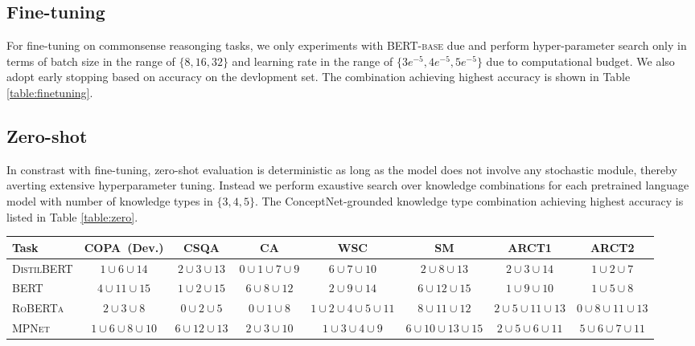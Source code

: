 \documentclass[11pt,a4paper]{article}
\newcommand{\tabref}[1]{Table \ref{#1}}
\begin{document}
\subsection{Fine-tuning}
For fine-tuning on commonsense reasonging tasks, we only experiments with \textsc{BERT-base} due and perform hyper-parameter search only in terms of batch size in the range of $\{8, 16, 32\}$ and learning rate in the range of $\{3e^{-5}, 4e^{-5}, 5e^{-5}\}$ due to computational budget. We also adopt early stopping based on accuracy on the devlopment set. The combination achieving highest accuracy is shown in \tabref{table:finetuning}.

\subsection{Zero-shot}
In constrast with fine-tuning, zero-shot evaluation is deterministic as long as the model does not involve any stochastic module, thereby averting extensive hyperparameter tuning.
Instead we perform exaustive search over knowledge combinations for each pretrained language model with number of knowledge types in $\{3,4,5\}$. The ConceptNet-grounded knowledge type combination achieving highest accuracy is listed in Table \ref{table:zero}.
\begin{table*}[tb!]
	\centering
	\scriptsize
	\begin{tabular}{l|ccccccc}
		\toprule
		\textbf{Task} &\textbf{COPA~(Dev.)} &\textbf{CSQA} &\textbf{CA} &\textbf{WSC} &\textbf{SM} &\textbf{ARCT1} &\textbf{ARCT2}\\
		\midrule
		\textsc{DistilBERT}  &$1\cup 6\cup 14$ &$2\cup 3\cup 13$ &$0\cup 1\cup 7\cup 9$  &$6\cup 7\cup 10$ &$2\cup 8\cup 13$ &$2\cup 3\cup 14$ &$1\cup 2\cup 7$\\
		\textsc{BERT}  &$4\cup 11\cup 15$ &$1\cup 2\cup 15$ &$6\cup 8\cup 12$  &$2\cup 9\cup 14$ &$6\cup 12\cup 15$ &$1\cup 9\cup 10$ &$1\cup 5\cup 8$\\
		\textsc{RoBERTa} &$2\cup 3\cup 8$  & $0\cup 2\cup 5$&$0\cup 1\cup 8$  &$1\cup 2\cup 4\cup 5\cup 11$ &$8\cup 11\cup 12$ &$2\cup 5\cup 11\cup 13$&$0\cup 8\cup 11\cup 13$\\
		\textsc{MPNet}  &$1\cup 6\cup 8\cup 10$ &$6\cup 12\cup 13$ &$2\cup 3\cup 10$  &$1\cup 3\cup 4\cup 9$ &$6\cup 10\cup 13\cup 15$ &$2\cup 5\cup 6\cup 11$ &$5\cup 6\cup 7\cup 11$ \\
		\bottomrule
	\end{tabular}
	\caption{Optimal zero-shot knowledge type combination for each PLM on each commonsense reasoning tasks.}
	\label{table:zero}
\end{table*}
\end{document}
